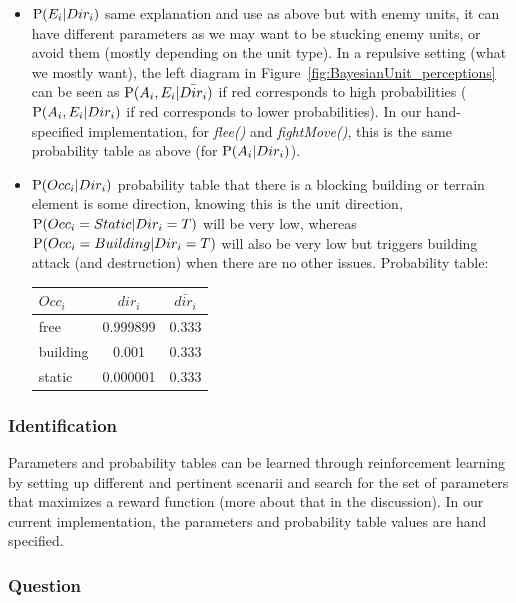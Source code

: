 \begin{itemize}
\item $\mathrm{P}(E_i | Dir_i)$ same explanation and use as above but with enemy units, it can have different parameters as we may want to be stucking enemy units, or avoid them (mostly depending on the unit type). In a repulsive setting (what we mostly want), the left diagram in Figure~\ref{fig:BayesianUnit_perceptions} can be seen as $\mathrm{P}(A_i,E_i | \bar{Dir_i})$ if red corresponds to high probabilities ($\mathrm{P}(A_i,E_i|Dir_i)$ if red corresponds to lower probabilities). In our hand-specified implementation, for \textit{flee()} and \textit{fightMove()}, this is the same probability table as above (for $\mathrm{P}(A_i | Dir_i)$).

\item $\mathrm{P}(Occ_i | Dir_i)$ probability table that there is a blocking building or terrain element is some direction, knowing this is the unit direction, $\mathrm{P}(Occ_i = Static | Dir_i = T)$ will be very low, whereas $\mathrm{P}(Occ_i = Building | Dir_i = T)$ will also be very low but triggers building attack (and destruction) when there are no other issues.
Probability table:\\
\begin{center}
\begin{tabular}{|l|c|c|}
\hline
$Occ_i$ & $dir_i$ & $\bar{dir_i}$ \\
\hline
free & 0.999899 & 0.333 \\
building & 0.001 & 0.333 \\
static & 0.000001 & 0.333 \\
\hline
\end{tabular}
\end{center}

\end{itemize}



\subsubsection{Identification}

Parameters and probability tables can be learned through reinforcement learning \citep{Sutton,Asmuth09} by setting up different and pertinent scenarii and search for the set of parameters that maximizes a reward function (more about that in the discussion). In our current implementation, the parameters and probability table values are hand specified.

\subsubsection{Question}

